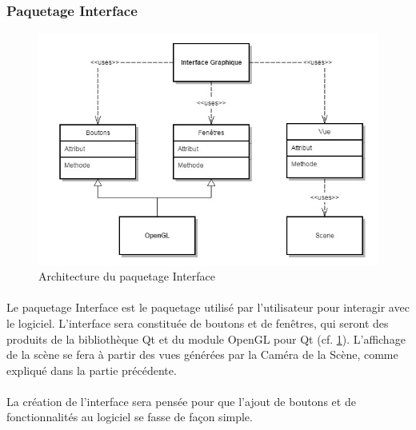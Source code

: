 \subsubsection{Paquetage Interface}

\begin{figure}[h]
		\centering
		\includegraphics[scale=0.4]{package_interface.jpg}
		\caption{\label{fig:paqInterface} Architecture du paquetage Interface}
\end{figure}

\paragraph{}
Le paquetage Interface est le paquetage utilisé par l’utilisateur pour interagir avec le logiciel. L’interface sera constituée de boutons et de fenêtres, qui seront des produits de la bibliothèque Qt et du module OpenGL pour Qt (cf. \ref{fig:paqInterface}). L’affichage de la scène se fera à partir des vues générées par la Caméra de la Scène, comme expliqué dans la partie précédente.

\paragraph{}
La création de l’interface sera pensée pour que l’ajout de boutons et de fonctionnalités au logiciel se fasse de façon simple.

\newpage
